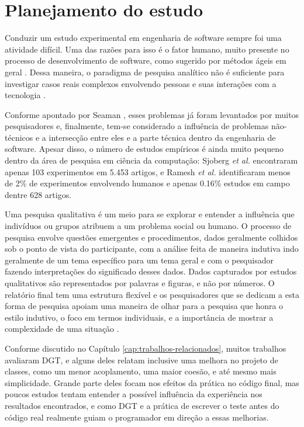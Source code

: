 \chapter{Planejamento do estudo} 
\label{cap:qualitativo-planejamento}

Conduzir um estudo experimental em engenharia de software sempre foi uma
atividade difícil. Uma das razões para isso é o fator humano, muito presente 
no processo de desenvolvimento de software, como sugerido por métodos ágeis  em
geral \cite{AgileManifesto}. Dessa maneira, o paradigma de pesquisa analítico 
não é suficiente para investigar casos reais complexos envolvendo pessoas e 
suas interações com a tecnologia \cite{guidelines-case-study}.

Conforme apontado por Seaman \cite{seaman}, esses problemas já foram levantados
por muitos pesquisadores e, finalmente, tem-se considerado a influência de
problemas não-técnicos e a intersecção entre eles e a parte técnica
dentro da engenharia de software. 
Apesar disso, o número de estudos empíricos é ainda muito pequeno dentro da área
de pesquisa em ciência da computação: Sjoberg \textit{et al.} \cite{sjoberg} encontraram
apenas 103 experimentos em 5.453 artigos, e Ramesh \textit{et al.} \cite{ramesh}
identificaram menos de 2\% de experimentos envolvendo humanos e apenas 0.16\% 
estudos em campo dentre 628 artigos.

Uma pesquisa qualitativa é um meio para se explorar e entender a influência que 
indivíduos ou grupos atribuem a um problema social ou humano. O processo de
pesquisa envolve questões emergentes e procedimentos, dados geralmente colhidos
sob o ponto de vista do participante, com a análise feita de maneira indutiva
indo geralmente de um tema específico para um tema geral e com o pesquisador
fazendo interpretações do significado desses dados. Dados capturados por estudos
qualitativos são representados por palavras e figuras, e não por números.
O relatório final tem uma estrutura flexível e os pesquisadores que se
dedicam a esta forma de pesquisa apoiam uma maneira de olhar para a pesquisa que
honra o estilo indutivo, o foco em termos individuais, e a importância de mostrar a 
complexidade de uma situação \cite{creswell}. 

Conforme discutido no Capítulo \ref{cap:trabalhos-relacionados}, muitos 
trabalhos avaliaram DGT, e alguns deles relatam inclusive uma melhora
no projeto de classes, como um menor acoplamento, uma maior coesão, e até mesmo
mais simplicidade. 
Grande parte deles focam nos efeitos da prática no código final, mas poucos 
estudos tentam entender a possível influência da experiência
nos resultados encontrados, e como DGT e a prática de escrever o teste 
antes do código real realmente guiam o programador 
em direção a essas melhorias.

